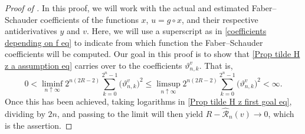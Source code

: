 \documentclass[12pt,reqno]{article}
\def\ua{\uparrow}
\def\wh{\widehat}
\numberwithin{equation}{section}
\def\cR{{\mathscr R}}
\theoremstyle{definition}
\def\ua{\uparrow}
\def\wh{\widehat}
\begin{document}
\begin{proof}[Proof of ]
	In this proof, we will work with the actual and estimated Faber--Schauder coefficients of the functions $x$,  $u=g\circ x$, and their respective antiderivatives $y$ and $v$. Here, we will use a superscript as in \eqref{coefficients depending on f eq} to indicate from which function the Faber--Schauder coefficients will be computed. Our goal in this proof is to show that \eqref{Prop tilde H z a assumption eq} carries over to the coefficients $\vartheta^v_{n,k}$.
	That is, 
	\begin{equation}\label{Prop tilde H z first goal eq}
		0<\liminf_{n \ua \infty}2^{n(2{R}-2)}\sum_{k = 0}^{2^{n}-1}\big(\vartheta^v_{n,k}\big)^2\le \limsup_{n \ua \infty}2^{n(2{R}-2)}\sum_{k = 0}^{2^{n}-1}\big(\vartheta^v_{n,k}\big)^2<\infty.	\end{equation}
Once this has been achieved, taking logarithms in \eqref{Prop tilde H z first goal eq}, dividing by $2n$, and passing to the limit will then yield
	${R}-\wh\cR_n(v)\to0$, which is the assertion. 
	

\end{proof}
\end{document}
